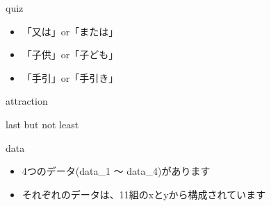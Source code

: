 \documentclass[
  ignorenonframetext,
]{beamer}
\providecommand{\tightlist}{%
  \setlength{\itemsep}{0pt}\setlength{\parskip}{0pt}}
\begin{document}
\begin{frame}{quiz}
\protect\hypertarget{quiz}{}
\Huge

\begin{itemize}[<+->]
\tightlist
\item
  「又は」or「または」 \bigskip
\item
  「子供」or「子ども」 \bigskip
\item
  「手引」or「手引き」
\end{itemize}
\end{frame}

\begin{frame}{attraction}
\protect\hypertarget{attraction}{}
\vspace*{-4pt}
\end{frame}

\begin{frame}{last but not least}
\protect\hypertarget{last-but-not-least}{}
\end{frame}

\begin{frame}{data}
\protect\hypertarget{data}{}
\begin{itemize}[<+->]
\item
  4つのデータ(data\_1 ～ data\_4)があります
\item
  それぞれのデータは、11組のxとyから構成されています
\end{itemize}
\end{frame}
\end{document}

